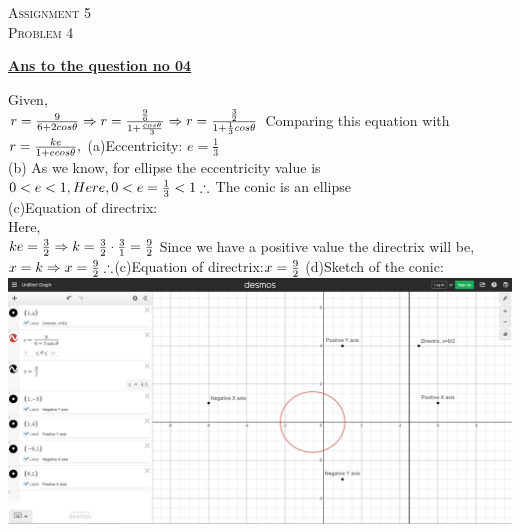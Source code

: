 \documentclass{article}
\begin{document}
\begin{newpage}
    \begin{flushright}
    \textsc{Assignment 5}\\
    \textsc{Problem 4}\\
    [1 cm]
    \end{flushright}
\begin{center}
  \textbf{\Large \underline {Ans to the question no 04}}\\
  [0.5 cm]
\end{center}
\Large {Given, \\[3mm]
$r=\frac{9}{6+2cos \theta}\\[3mm]
\Rightarrow r=\frac{\frac{9}{6}}{1+\frac{cos \theta}{3}} \\[3mm]
\Rightarrow r=\frac{\frac{3}{2}}{1+\frac{1}{3}cos \theta} \\[3mm]$
Comparing this equation with $r=\frac{ke}{1+ecos\theta},\\[3mm]$
(a)Eccentricity: $e=\frac{1}{3}$\\[3mm]
(b) As we know, for ellipse the eccentricity value is $0<e<1,\\[3mm]
Here, 0<e=\frac{1}{3}<1 \\[3mm]
\therefore $ The conic is an ellipse\\[3mm]
(c)Equation of directrix:\\[3mm]
Here,\\[3mm]$ ke=\frac{3}{2}\\[3mm]
\Rightarrow k=\frac{3}{2}\cdot\frac{3}{1}=\frac{9}{2}\\[3mm]$
Since we have a positive value the directrix will be,\\[3mm]
$ x=k\\[3mm]
\Rightarrow x=\frac{9}{2}\\[3mm]
\therefore$(c)Equation of directrix:$ x=\frac{9}{2}\\[1cm]$
(d)Sketch of the conic:\\[3mm]}
\includegraphics[width=15cm]{sketch question 4.PNG}
\end{newpage}
\end{document}
